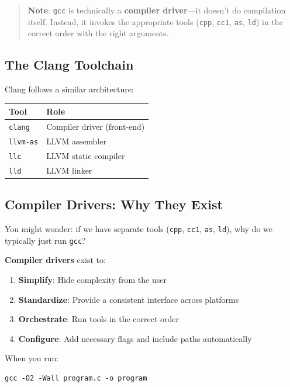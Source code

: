 \begin{quote}
\textbf{Note}: \texttt{gcc} is technically a \textbf{compiler driver}—it doesn't do compilation itself. Instead, it invokes the appropriate tools (\texttt{cpp}, \texttt{cc1}, \texttt{as}, \texttt{ld}) in the correct order with the right arguments.
\end{quote}

\subsection{The Clang Toolchain}

Clang follows a similar architecture:

\begin{center}
\begin{tabular}{|l|l|}
\hline
\textbf{Tool} & \textbf{Role} \\
\hline
\texttt{clang} & Compiler driver (front-end) \\
\hline
\texttt{llvm-as} & LLVM assembler \\
\hline
\texttt{llc} & LLVM static compiler \\
\hline
\texttt{lld} & LLVM linker \\
\hline
\end{tabular}
\end{center}

\subsection{Compiler Drivers: Why They Exist}

You might wonder: if we have separate tools (\texttt{cpp}, \texttt{cc1}, \texttt{as}, \texttt{ld}), why do we typically just run \texttt{gcc}?

\textbf{Compiler drivers} exist to:
\begin{enumerate}
    \item \textbf{Simplify}: Hide complexity from the user
    \item \textbf{Standardize}: Provide a consistent interface across platforms
    \item \textbf{Orchestrate}: Run tools in the correct order
    \item \textbf{Configure}: Add necessary flags and include paths automatically
\end{enumerate}

When you run:

\begin{verbatim}
gcc -O2 -Wall program.c -o program
\end{verbatim}

